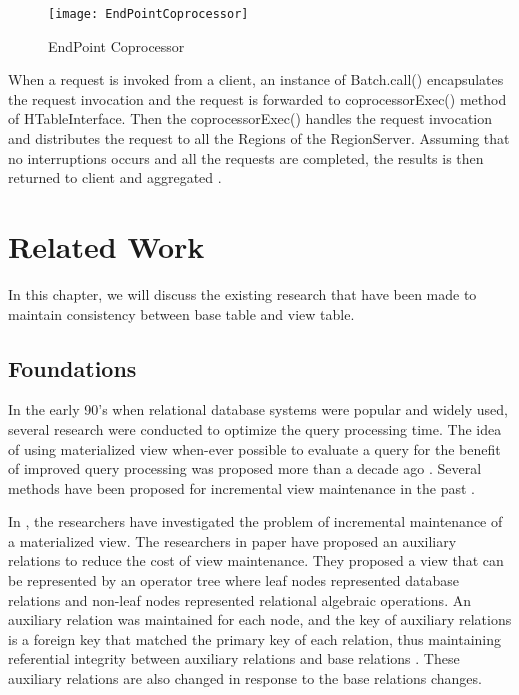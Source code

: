 \documentclass[11pt,a4paper,bibtotoc,idxtotoc,headsepline,footsepline,footexclude,BCOR12mm,DIV13]{scrbook}
\begin{document}
\begin{figure}
    \centering
    \texttt{[image: EndPointCoprocessor]}
    \caption{EndPoint Coprocessor}
    \label{Endpoint Coprocessor}
    
\end{figure}

When a request is invoked from a client, an instance of Batch.call() encapsulates the request invocation and the request is forwarded to coprocessorExec() method of HTableInterface. Then the coprocessorExec() handles the request invocation and distributes the request to all the Regions of the RegionServer. Assuming that no interruptions occurs and all the requests are completed, the results is then returned to client and aggregated \cite{coprocessor:detail}.


\chapter{Related Work}
\label{chap:relatedwork}
In this chapter, we will discuss the existing research that have been made to maintain consistency between base table and view table.

\section{Foundations}
\label{Foundations}
In the early 90's when relational database systems were popular and widely used, several research were conducted to optimize the query processing time. The idea of using materialized view when-ever possible to evaluate a query for the benefit of improved query processing was proposed more than a decade ago \cite{maintenance:optimizingqueries}. Several methods have been proposed for incremental view maintenance in the past \cite{blakeley:efficiently, gupta:maintaining, agrawal:efficient}.

In \cite{incremental:materializedviews}, the researchers have investigated the problem of incremental maintenance of a materialized view. The researchers in paper \cite{incremental:materializedviews} have proposed an auxiliary relations to reduce the cost of view maintenance. They proposed a view that can be represented by an operator tree \cite{database:concepts} where leaf nodes represented database relations and non-leaf nodes represented relational algebraic operations. An auxiliary relation was maintained for each node, and the key of auxiliary relations is a foreign key that matched the primary key of each relation, thus maintaining referential integrity between auxiliary relations and base relations \cite{database:concepts}. These auxiliary relations are also changed in response to the base relations changes.
\end{document}
